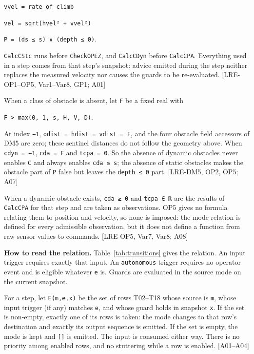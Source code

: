 \documentclass[
  10pt,
]{article}
\newcounter{none} %
\begin{document}
\texttt{vvel\ =\ rate\_of\_climb}

\texttt{vel\ =\ sqrt(hvel²\ +\ vvel²)}

\texttt{P\ =\ (ds\ ≤\ s)\ ∨\ (depth\ ≤\ 0)}.

\texttt{CalcCStc} runs before \texttt{CheckOPEZ}, and \texttt{CalcCDyn}
before \texttt{CalcCPA}. Everything used in a step comes from that
step's snapshot: advice emitted during the step neither replaces the
measured velocity nor causes the guards to be re-evaluated.
{[}LRE-OP1--OP5, Var1--Var8, GP1; A01{]}

When a class of obstacle is absent, let \texttt{F} be a fixed real with

\texttt{F\ \textgreater{}\ max(0,\ 1,\ s,\ H,\ V,\ D)}.

At index \texttt{−1}, \texttt{odist\ =\ hdist\ =\ vdist\ =\ F}, and the
four obstacle field accessors of DM5 are zero; these sentinel distances
do not follow the geometry above. When \texttt{cdyn\ =\ −1},
\texttt{cda\ =\ F} and \texttt{tcpa\ =\ 0}. So the absence of dynamic
obstacles never enables \texttt{C} and always enables
\texttt{cda\ ≥\ s}; the absence of static obstacles makes the obstacle
part of \texttt{P} false but leaves the \texttt{depth\ ≤\ 0} part.
{[}LRE-DM5, OP2, OP5; A07{]}

When a dynamic obstacle exists, \texttt{cda\ ≥\ 0} and
\texttt{tcpa\ ∈\ ℝ} are the results of \texttt{CalcCPA} for that step
and are taken as observations. OP5 gives no formula relating them to
position and velocity, so none is imposed: the mode relation is defined
for every admissible observation, but it does not define a function from
raw sensor values to commands. {[}LRE-OP5, Var7, Var8; A08{]}

\textbf{How to read the relation.} Table~\ref{tab:transitions} gives the relation. An input trigger requires exactly
that input. An \texttt{autonomous} trigger requires no operator event
and is eligible whatever \texttt{e} is. Guards are evaluated in the
source mode on the current snapshot.

For a step, let \texttt{E(m,e,x)} be the set of rows T02--T18 whose
source is \texttt{m}, whose input trigger (if any) matches \texttt{e},
and whose guard holds in snapshot \texttt{x}. If the set is non-empty,
exactly one of its rows is taken: the mode changes to that row's
destination and exactly its output sequence is emitted. If the set is
empty, the mode is kept and \texttt{{[}{]}} is emitted. The input is
consumed either way. There is no priority among enabled rows, and no
stuttering while a row is enabled. {[}A01--A04{]}
\end{document}

